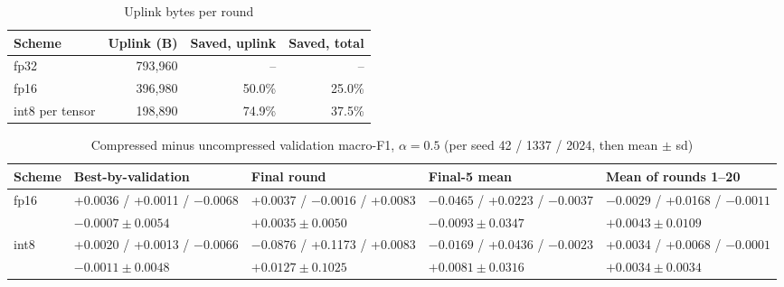\begin{table}[h]
\centering
\caption{Uplink bytes per round}
\label{tab:compbytes}
\footnotesize
\begin{tabular}{@{}lrrr@{}}
\toprule
Scheme & Uplink (B) & Saved, uplink & Saved, total\\
\midrule
fp32 & 793,960 & -- & --\\ %
fp16 & 396,980 & 50.0\% & 25.0\%\\ %
int8 per tensor & 198,890 & 74.9\% & 37.5\%\\ %
\bottomrule
\end{tabular}
\end{table}

\begin{table}[t]
\centering
\caption{Compressed minus uncompressed validation macro-F1, $\alpha=0.5$ (per seed 42 / 1337 / 2024, then mean $\pm$ sd)} %
\label{tab:compf1}
\footnotesize
\begin{tabular}{@{}lllll@{}}
\toprule
Scheme & Best-by-validation & Final round & Final-5 mean & Mean of rounds 1--20\\ %
\midrule
fp16 & +0.0036 / +0.0011 / $-0.0068$ & +0.0037 / $-0.0016$ / +0.0083 & $-0.0465$ / +0.0223 / $-0.0037$ & $-0.0029$ / +0.0168 / $-0.0011$\\ %
 & $-0.0007\pm0.0054$ & $+0.0035\pm0.0050$ & $-0.0093\pm0.0347$ & $+0.0043\pm0.0109$\\ %
int8 & +0.0020 / +0.0013 / $-0.0066$ & $-0.0876$ / +0.1173 / +0.0083 & $-0.0169$ / +0.0436 / $-0.0023$ & +0.0034 / +0.0068 / $-0.0001$\\ %
 & $-0.0011\pm0.0048$ & $+0.0127\pm0.1025$ & $+0.0081\pm0.0316$ & $+0.0034\pm0.0034$\\ %
\bottomrule
\end{tabular}
\end{table}

